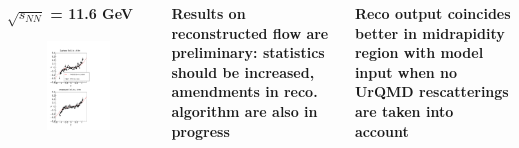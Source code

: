 \documentclass[dvipsnames] {beamer}
\begin{document}
\begin{frame}[shrink=5]
\begin{columns}[c]
     \begin{block}{\bf \centering $\sqrt{s_{NN}}$ = 11.6 GeV}
        \begin{figure}[H]
      \includegraphics[width=1.\textwidth]{energy70AGeV_proton_urqOFF.pdf}
        \end{figure}     
     \end{block}
     
     \begin{block}{}
       {\color {red} \bf Results on reconstructed flow are preliminary: statistics should be increased, amendments in reco. algorithm are also in progress}
     \end{block}
     \begin{block}{}
       \bf
          {\color {blue} Reco output coincides better in midrapidity region with model input when no UrQMD rescatterings are taken into account}  
     \end{block}
   \end{columns}
 \end{frame}
\end{document}
